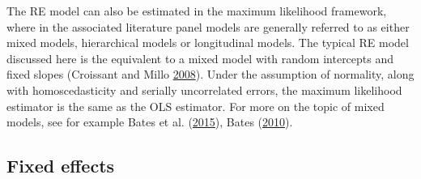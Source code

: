 \documentclass[
  12pt,
  a4paper]{article}
\begin{document}
The RE model can also be estimated in the maximum likelihood framework,
where in the associated literature panel models are generally referred
to as either mixed models, hierarchical models or longitudinal models.
The typical RE model discussed here is the equivalent to a mixed model
with random intercepts and fixed slopes (Croissant and Millo
\protect\hyperlink{ref-R-plm_a}{2008}). Under the assumption of
normality, along with homoscedasticity and serially uncorrelated errors,
the maximum likelihood estimator is the same as the OLS estimator. For
more on the topic of mixed models, see for example Bates et al.
(\protect\hyperlink{ref-R-lme4}{2015}), Bates
(\protect\hyperlink{ref-Bates2010}{2010}).

\hypertarget{fe}{%
\subsection{Fixed effects}\label{fe}}
\end{document}

